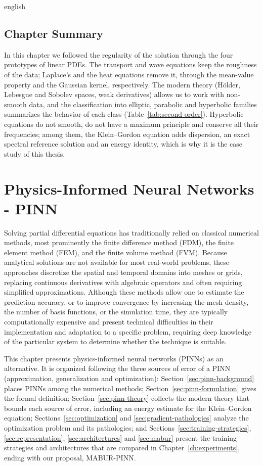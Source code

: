 \documentclass[12pt,letterpaper,twoside]{book}
\begin{document}
\begin{hyphenrules}{english}
\section{Chapter Summary}\label{sec:ch2-summary}

In this chapter we followed the regularity of the solution through the four prototypes of linear PDEs.
The transport and wave equations keep the roughness of the data; Laplace's and the heat equations remove
it, through the mean-value property and the Gaussian kernel, respectively. The modern theory (Hölder,
Lebesgue and Sobolev spaces, weak derivatives) allows us to work with non-smooth data, and the
classification into elliptic, parabolic and hyperbolic families summarizes the behavior of each class
(Table~\ref{tab:second-order}). Hyperbolic equations do not smooth, do not have a maximum principle and
conserve all their frequencies; among them, the Klein--Gordon equation adds dispersion, an exact
spectral reference solution and an energy identity, which is why it is the case study of this thesis.

\chapter{Physics-Informed Neural Networks - PINN}\label{ch:pinns}

Solving partial differential equations has traditionally relied on classical numerical methods, most
prominently the finite difference method (FDM), the finite element method (FEM), and the finite volume
method (FVM). Because analytical solutions are not available for most real-world problems, these
approaches discretize the spatial and temporal domains into meshes or grids, replacing continuous
derivatives with algebraic operators and often requiring simplified approximations. Although these
methods allow one to estimate the prediction accuracy, or to improve convergence by increasing the
mesh density, the number of basis functions, or the simulation time, they are typically computationally
expensive and present technical difficulties in their implementation and adaptation to a specific
problem, requiring deep knowledge of the particular system to determine whether the technique is
suitable.

This chapter presents physics-informed neural networks (PINNs) as an alternative. It is organized
following the three sources of error of a PINN (approximation, generalization and optimization):
Section~\ref{sec:pinn-background} places PINNs among the numerical methods; Section~\ref{sec:pinn-formulation}
gives the formal definition; Section~\ref{sec:pinn-theory} collects the modern theory that bounds each source
of error, including an energy estimate for the Klein--Gordon equation; Sections~\ref{sec:optimization} and \ref{sec:gradient-pathologies}
analyze the optimization problem and its pathologies; and
Sections~\ref{sec:training-strategies}, \ref{sec:representation}, \ref{sec:architectures} and \ref{sec:mabur} present the training
strategies and architectures that are compared in Chapter~\ref{ch:experiments}, ending with our proposal,
MABUR-PINN.


\end{hyphenrules}
\end{document}
